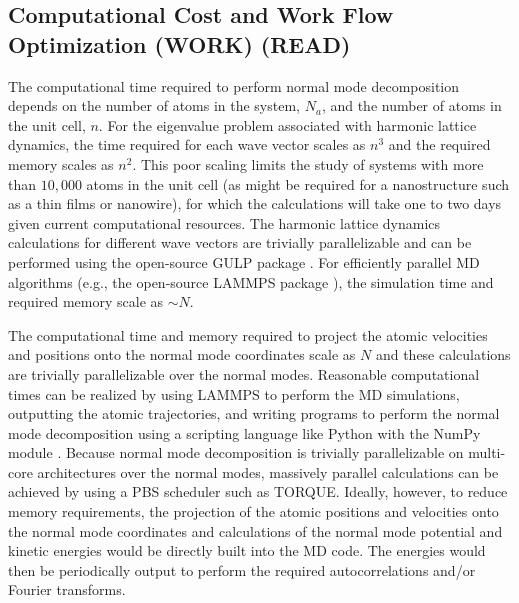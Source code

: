 \subsection{\label{Subsection_Comp_Details_4}Computational Cost 
and Work Flow Optimization (WORK) (READ)}

The computational time required to perform normal mode decomposition 
depends on the number of atoms in the system, $N_a$, and the number of 
atoms in the unit cell, $n$. 
For the eigenvalue problem associated with 
harmonic lattice dynamics, the time required for each wave vector scales 
as $n^3$ and the required memory scales as $n^2$. This poor scaling limits 
the study of systems with more than $10,000$ atoms in the unit cell (as 
might be required for a nanostructure such as a thin films or nanowire), 
for which the calculations will take one to two days given current 
computational resources. The harmonic lattice dynamics calculations for 
different wave vectors are trivially parallelizable and can be performed 
using the open-source GULP package \cite{gale_general_2003}. For 
efficiently parallel MD algorithms (e.g., the open-source LAMMPS package 
\cite{plimpton_fast_1995}), the simulation time and required memory 
scale as $\sim N$.

The 
computational time and memory required to project the atomic velocities 
and positions onto the normal mode coordinates scale as $N$ and these 
calculations are trivially parallelizable over the normal modes. Reasonable 
computational times can be realized by using LAMMPS to perform the MD 
simulations, outputting the atomic trajectories, and writing programs to 
perform the normal mode decomposition using a scripting language like 
Python with the NumPy module \cite{dubois_numerical_1996}. 
Because normal mode 
decomposition is trivially parallelizable on multi-core architectures over 
the normal modes, massively parallel calculations can be achieved by using 
a PBS scheduler such as TORQUE. Ideally, however, to reduce memory 
requirements, the projection of the atomic positions and velocities onto 
the normal mode coordinates and calculations of the normal mode potential 
and kinetic energies would be directly built into the MD code. The energies 
would then be periodically output to perform the required autocorrelations 
and/or Fourier transforms.

